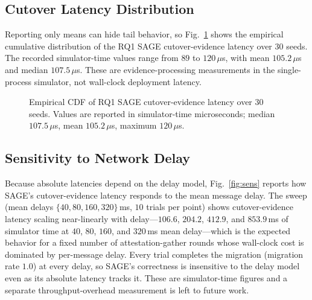 \documentclass[journal]{IEEEtran}
\theoremstyle{remark}
\begin{document}
\subsection{Cutover Latency Distribution}
Reporting only means can hide tail behavior, so Fig.~\ref{fig:cdf} shows the empirical
cumulative distribution of the RQ1 SAGE cutover-evidence latency over $30$ seeds. The
recorded simulator-time values range from $89$ to $120\,\mu$s, with mean $105.2\,\mu$s and median
$107.5\,\mu$s. These are evidence-processing measurements in the
single-process simulator, not wall-clock deployment latency.

\begin{figure}[t]
\centering
{}
\caption{Empirical CDF of RQ1 SAGE cutover-evidence latency over $30$ seeds. Values are
reported in simulator-time microseconds; median $107.5\,\mu$s, mean $105.2\,\mu$s, maximum
$120\,\mu$s.}
\label{fig:cdf}
\end{figure}

\subsection{Sensitivity to Network Delay}
Because absolute latencies depend on the delay model, Fig.~\ref{fig:sens} reports how SAGE's
cutover-evidence latency responds to the mean message delay. The sweep
(mean delays $\{40,80,160,320\}\,$ms, $10$ trials per point)
shows cutover-evidence latency scaling near-linearly with delay---$106.6$, $204.2$, $412.9$, and
$853.9\,$ms of simulator time at $40$, $80$, $160$, and $320\,$ms mean delay---which is the
expected behavior for a fixed number of attestation-gather rounds whose wall-clock cost is
dominated by per-message delay. Every trial completes the migration (migration rate $1.0$) at
every delay, so SAGE's correctness is insensitive to the delay model even as its absolute latency
tracks it. These are simulator-time figures and a separate throughput-overhead measurement is
left to future work.
\end{document}
